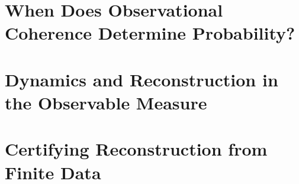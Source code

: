 \documentclass[11pt]{article}
\theoremstyle{definition}
\begin{document}
\part{When Does Observational Coherence Determine Probability?}

\setcounter{section}{0}


\newpage

\part{Dynamics and Reconstruction in the Observable Measure}

\setcounter{section}{0}


\newpage

\part{Certifying Reconstruction from Finite Data}

\setcounter{section}{0}


\newpage



\end{document}
